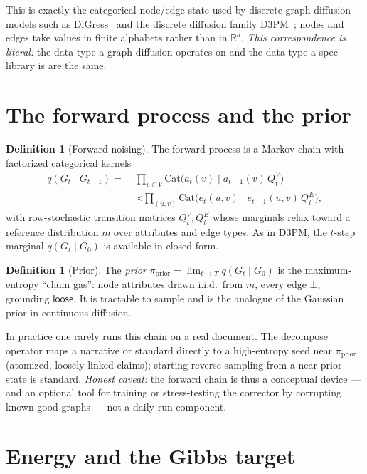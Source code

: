 \documentclass[11pt,letterpaper]{article}
\theoremstyle{plain}
\theoremstyle{definition}
\newtheorem{definition}[theorem]{Definition}
\newcommand{\prior}{\pi_{\mathrm{prior}}}
\begin{document}
This is exactly the categorical node/edge state used by discrete graph-diffusion
models such as DiGress~\cite{vignac2022digress} and the discrete diffusion family
D3PM~\cite{austin2021d3pm}; nodes and edges take values in finite alphabets rather
than in $\mathbb{R}^d$. \emph{This correspondence is literal:} the data type a graph
diffusion operates on and the data type a spec library is are the same.

\section{The forward process and the prior}
\label{sec:forward}

\begin{definition}[Forward noising]
The forward process is a Markov chain with factorized categorical kernels
\[
\begin{aligned}
  q(G_t\mid G_{t-1})=\;&\prod_{v\in V}\mathrm{Cat}\big(a_t(v)\mid a_{t-1}(v)\,Q^V_t\big)\\
  &\times\prod_{(u,v)}\mathrm{Cat}\big(e_t(u,v)\mid e_{t-1}(u,v)\,Q^E_t\big),
\end{aligned}
\]
with row-stochastic transition matrices $Q^V_t,Q^E_t$ whose marginals relax toward
a reference distribution $m$ over attributes and edge types. As in D3PM, the
$t$-step marginal $q(G_t\mid G_0)$ is available in closed form.
\end{definition}

\begin{definition}[Prior]
The \emph{prior} $\prior=\lim_{t\to T}q(G_t\mid G_0)$ is the maximum-entropy
``claim gas'': node attributes drawn i.i.d.\ from $m$, every edge $\bot$, grounding
$\textsf{loose}$. It is tractable to sample and is the analogue of the Gaussian
prior in continuous diffusion.
\end{definition}

In practice one rarely runs this chain on a real document. The \textsf{decompose}
operator maps a narrative or standard directly to a high-entropy seed near
$\prior$ (atomized, loosely linked claims); starting reverse sampling from a
near-prior state is standard. \emph{Honest caveat:} the forward chain is thus a
conceptual device --- and an optional tool for training or stress-testing the
corrector by corrupting known-good graphs --- not a daily-run component.

\section{Energy and the Gibbs target}
\label{sec:energy}
\end{document}
